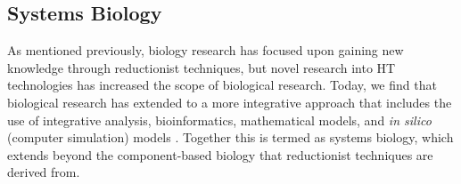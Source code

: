 \subsection{Systems Biology} \label{intro-sysbio}
As mentioned previously, biology research has focused upon gaining new knowledge through reductionist techniques, but novel research into \acrshort{HT} technologies has increased the scope of biological research. Today, we find that biological research has extended to a more integrative approach that includes the use of integrative analysis, bioinformatics, mathematical models, and \textit{in silico} (computer simulation) models \citep{Palsson2006}. Together this is termed as systems biology, which extends beyond the component-based biology that reductionist techniques are derived from. 

